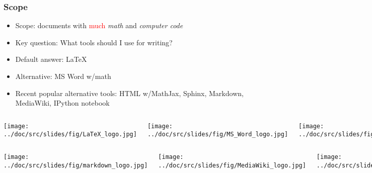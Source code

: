 \documentclass{beamer}
\begin{document}
\begin{frame}
\frametitle{Scope}

\begin{itemize}
\pause
  \item Scope: documents with \textcolor{red}{much} \emph{math} and \emph{computer code}
\pause
  \item Key question: What tools should I use for writing?
\pause
  \item Default answer: {\LaTeX}
\pause
  \item Alternative: MS Word w/math
\pause
  \item Recent popular alternative tools: HTML w/MathJax, Sphinx, Markdown, MediaWiki, IPython notebook
\end{itemize}
\noindent
\begin{columns}
\vspace{6mm}
\centerline{\texttt{[image: ../doc/src/slides/fig/LaTeX\_logo.jpg]}}
\vspace{6mm}

\vspace{6mm}
\centerline{\texttt{[image: ../doc/src/slides/fig/MS\_Word\_logo.jpg]}}
\vspace{6mm}

\vspace{6mm}
\centerline{\texttt{[image: ../doc/src/slides/fig/sphinx\_logo.png]}}
\vspace{6mm}

\end{columns}
\begin{columns}
\vspace{6mm}
\centerline{\texttt{[image: ../doc/src/slides/fig/markdown\_logo.jpg]}}
\vspace{6mm}

\vspace{6mm}
\centerline{\texttt{[image: ../doc/src/slides/fig/MediaWiki\_logo.jpg]}}
\vspace{6mm}

\vspace{6mm}
\centerline{\texttt{[image: ../doc/src/slides/fig/IPython\_logo.png]}}
\vspace{6mm}

\end{columns}
\end{frame}
\end{document}
